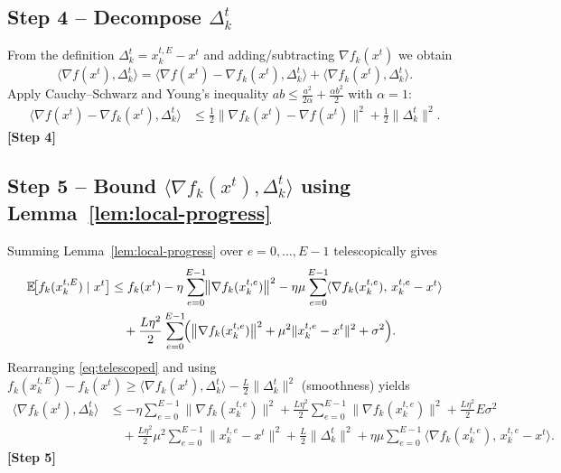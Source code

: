 \documentclass{article}
\begin{document}
\subsection*{Step 4 – Decompose $\Delta_{k}^{t}$}
From the definition $\Delta_{k}^{t}=x_{k}^{t,E}-x^{t}$ and adding/subtracting $\nabla f_k(x^{t})$ we obtain
\[
\langle \nabla f(x^{t}),\Delta_{k}^{t}\rangle
= \langle \nabla f(x^{t})-\nabla f_k(x^{t}),\Delta_{k}^{t}\rangle
  +\langle \nabla f_k(x^{t}),\Delta_{k}^{t}\rangle .
\]
Apply Cauchy–Schwarz and Young’s inequality $ab\le\frac{a^{2}}{2\alpha}+\frac{\alpha b^{2}}{2}$ with $\alpha=1$:
\begin{align}
\langle \nabla f(x^{t})-\nabla f_k(x^{t}),\Delta_{k}^{t}\rangle
&\le \frac{1}{2}\|\nabla f_k(x^{t})-\nabla f(x^{t})\|^{2}
   +\frac{1}{2}\|\Delta_{k}^{t}\|^{2}. \label{eq:cross}
\end{align}
\textbf{[Step 4]}

\subsection*{Step 5 – Bound $\langle \nabla f_k(x^{t}),\Delta_{k}^{t}\rangle$ using Lemma~\ref{lem:local-progress}}
Summing Lemma~\ref{lem:local-progress} over $e=0,\dots,E-1$ telescopically gives
\begin{align}
\mathbb{E}\!\bigl[f_k(x_{k}^{t,E})\mid x^{t}\bigr]
&\le f_k(x^{t})
    -\eta\sum_{e=0}^{E-1}\!\bigl\|\nabla f_k(x_{k}^{t,e})\bigr\|^{2}
    -\eta\mu\sum_{e=0}^{E-1}\!\langle \nabla f_k(x_{k}^{t,e}),\,x_{k}^{t,e}-x^{t}\rangle \nonumber\\
&\quad+\frac{L\eta^{2}}{2}\sum_{e=0}^{E-1}\!\Bigl(\bigl\|\nabla f_k(x_{k}^{t,e})\bigr\|^{2}
      +\mu^{2}\|x_{k}^{t,e}-x^{t}\|^{2}+\sigma^{2}\Bigr). \label{eq:telescoped}
\end{align}
Rearranging \eqref{eq:telescoped} and using $f_k(x_{k}^{t,E})-f_k(x^{t})\ge \langle \nabla f_k(x^{t}),\Delta_{k}^{t}\rangle -\frac{L}{2}\|\Delta_{k}^{t}\|^{2}$ (smoothness) yields
\begin{align}
\langle \nabla f_k(x^{t}),\Delta_{k}^{t}\rangle
&\le -\eta\sum_{e=0}^{E-1}\!\bigl\|\nabla f_k(x_{k}^{t,e})\bigr\|^{2}
   +\frac{L\eta^{2}}{2}\sum_{e=0}^{E-1}\!\bigl\|\nabla f_k(x_{k}^{t,e})\bigr\|^{2}
   +\frac{L\eta^{2}}{2}E\sigma^{2} \nonumber\\
&\quad+\frac{L\eta^{2}}{2}\mu^{2}\sum_{e=0}^{E-1}\!\|x_{k}^{t,e}-x^{t}\|^{2}
   +\frac{L}{2}\|\Delta_{k}^{t}\|^{2}
   +\eta\mu\sum_{e=0}^{E-1}\!\langle \nabla f_k(x_{k}^{t,e}),\,x_{k}^{t,e}-x^{t}\rangle . \label{eq:inner-bound}
\end{align}
\textbf{[Step 5]}
\end{document}
